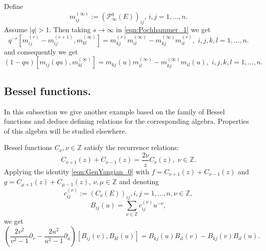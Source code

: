 \documentclass[10pt]{article}%
\numberwithin{equation}{section}
\newtheorem{lem}[thm]{Lemma}
\newcommand{\red}{\color{red}}
\newcommand{\gl}{{\mathfrak{gl}}}
\begin{document}
Define
\[
m_{ij}^{(\infty)}:=(\mathcal{P}_{\infty}^{q}(E))_{ij}, \, i,j=1,\ldots,n.
\]
Assume $|q|>1$. Then taking $s\to\infty$ in \eqref{eqn:Pochhammer_1} we get
\begin{equation}\label{eqn:Pochhammer_5}
q^{-r}[m^{(r)}_{ij}-m^{(r+1)}_{ij},m^{(\infty)}_{kl}]=m^{(r)}_{kj}m^{(\infty)}_{il}-m^{(\infty)}_{kj}m^{(r)}_{il}, \,\, i,j,k,l=1,\ldots,n.
\end{equation}
and consequently we get
\begin{equation}\label{eqn:Pochhammer_6}
(1-qu)[m_{ij}(qu),m^{(\infty)}_{kl}]=m_{kj}(u)m^{(\infty)}_{il}-m^{(\infty)}_{kj}m_{il}(u), \,\, i,j,k,l=1,\ldots,n.
\end{equation}
\subsection{Bessel functions.}
In this subsection we give another example based on the family of Bessel functions and deduce defining relations for the corresponding algebra. Properties of this algebra will be studied elsewhere.


Bessel functions $C_{\nu},\nu\in \mathbb{Z}$ satisfy the recurrence relations:
\[
C_{\nu+1}(z)+C_{\nu-1}(z)=\frac{2\nu}{z}C_{\nu}(z),\,\, \nu\in \mathbb{Z}.
\]
Applying the identity \eqref{eqn:GenYangian_0} with $f=C_{\nu+1}(z)+C_{\nu-1}(z)$ and $g=C_{\mu+1}(z)+C_{\mu-1}(z)$, $\nu,\mu\in \mathbb{Z}$ and denoting
\[
c_{ij}^{(\nu)}:=(C_{\nu}(E))_{ij},i,j=1,\ldots,n,\nu\in\mathbb{Z},
\]
\[
B_{ij}(u)=\sum\limits_{\nu\in\mathbb{Z}}c_{ij}^{(\nu)} u^{-\nu},
\]
we get
\[
(\frac{2 v^2}{v^2-1}\partial_v-\frac{2 u^2}{u^2-1}\partial_u)[B_{ij}(v),B_{kl}(u)]=B_{kj}(u)B_{il}(v)-B_{kj}(v)B_{il}(u).
\]







    
\end{document}
